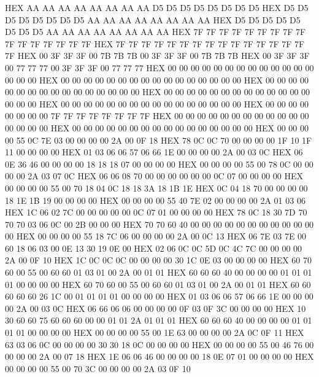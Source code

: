 \documentclass[10pt]{report}
\begin{document}
    HEX     AA AA AA AA AA AA AA AA D5 D5 D5 D5 D5 D5 D5 D5
    HEX     D5 D5 D5 D5 D5 D5 D5 D5 AA AA AA AA AA AA AA AA
    HEX     D5 D5 D5 D5 D5 D5 D5 D5 AA AA AA AA AA AA AA AA
    HEX     7F 7F 7F 7F 7F 7F 7F 7F 7F 7F 7F 7F 7F 7F 7F 7F
    HEX     7F 7F 7F 7F 7F 7F 7F 7F 7F 7F 7F 7F 7F 7F 7F 7F
    HEX     00 3F 3F 3F 00 7B 7B 7B 00 3F 3F 3F 00 7B 7B 7B
    HEX     00 3F 3F 3F 00 77 77 77 00 3F 3F 3F 00 77 77 77
    HEX     00 00 00 00 00 00 00 00 00 00 00 00 00 00 00 00
    HEX     00 00 00 00 00 00 00 00 00 00 00 00 00 00 00 00
    HEX     00 00 00 00 00 00 00 00 00 00 00 00 00 00 00 00
    HEX     00 00 00 00 00 00 00 00 00 00 00 00 00 00 00 00
    HEX     00 00 00 00 00 00 00 00 00 00 00 00 00 00 00 00
    HEX     00 00 00 00 00 00 00 00 7F 7F 7F 7F 7F 7F 7F 7F
    HEX     00 00 00 00 00 00 00 00 00 00 00 00 00 00 00 00
    HEX     00 00 00 00 00 00 00 00 00 00 00 00 00 00 00 00
    HEX     00 00 00 00 55 0C 7E 03 00 00 00 00 2A 00 0F 18
    HEX     78 0C 0C 70 00 00 00 00 1F 10 1F 11 00 00 00 00
    HEX     01 03 06 06 57 06 66 1E 00 00 00 00 2A 00 03 0C
    HEX     06 0E 36 46 00 00 00 00 18 18 18 07 00 00 00 00
    HEX     00 00 00 00 55 00 78 0C 00 00 00 00 2A 03 07 0C
    HEX     06 06 08 70 00 00 00 00 00 00 0C 07 00 00 00 00
    HEX     00 00 00 00 55 00 70 18 04 0C 18 18 3A 18 1B 1E
    HEX     0C 04 18 70 00 00 00 00 18 1E 1B 19 00 00 00 00
    HEX     00 00 00 00 55 40 7E 02 00 00 00 00 2A 01 03 06
    HEX     1C 06 02 7C 00 00 00 00 00 0C 07 01 00 00 00 00
    HEX     78 0C 18 30 7D 70 70 70 03 06 0C 00 2B 00 00 00
    HEX     70 70 60 40 00 00 00 00 00 00 00 00 00 00 00 00
    HEX     00 00 00 00 55 18 7C 06 00 00 00 00 2A 00 0C 13
    HEX     06 7E 03 7E 00 60 18 06 03 00 0E 13 30 19 0E 00
    HEX     02 06 0C 0C 5D 0C 4C 7C 00 00 00 00 2A 00 0F 10
    HEX     1C 0C 0C 0C 00 00 00 00 30 1C 0E 03 00 00 00 00
    HEX     60 70 60 00 55 00 60 60 01 03 01 00 2A 00 01 01
    HEX     60 60 60 40 00 00 00 00 01 01 01 01 00 00 00 00
    HEX     60 70 60 00 55 00 60 60 01 03 01 00 2A 00 01 01
    HEX     60 60 60 60 60 26 1C 00 01 01 01 01 00 00 00 00
    HEX     01 03 06 06 57 06 66 1E 00 00 00 00 2A 00 03 0C
    HEX     06 66 06 06 00 00 00 00 0F 03 0F 3C 00 00 00 00
    HEX     10 30 60 60 75 60 60 60 00 00 01 01 2A 01 01 01
    HEX     60 60 60 40 00 00 00 00 01 01 01 01 00 00 00 00
    HEX     00 00 00 00 55 00 1E 63 00 00 00 00 2A 0C 0F 11
    HEX     63 03 06 0C 00 00 00 00 30 30 18 0C 00 00 00 00
    HEX     00 00 00 00 55 00 46 76 00 00 00 00 2A 00 07 18
    HEX     1E 06 06 46 00 00 00 00 18 0E 07 01 00 00 00 00
    HEX     00 00 00 00 55 00 70 3C 00 00 00 00 2A 03 0F 10
\end{document}
